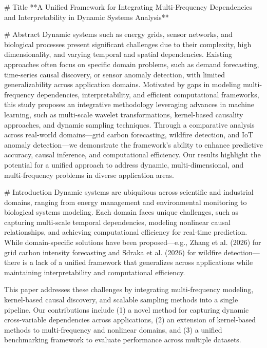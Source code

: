 # Title
**A Unified Framework for Integrating Multi-Frequency Dependencies and Interpretability in Dynamic Systems Analysis**

# Abstract
Dynamic systems such as energy grids, sensor networks, and biological processes present significant challenges due to their complexity, high dimensionality, and varying temporal and spatial dependencies. Existing approaches often focus on specific domain problems, such as demand forecasting, time-series causal discovery, or sensor anomaly detection, with limited generalizability across application domains. Motivated by gaps in modeling multi-frequency dependencies, interpretability, and efficient computational frameworks, this study proposes an integrative methodology leveraging advances in machine learning, such as multi-scale wavelet transformations, kernel-based causality approaches, and dynamic sampling techniques. Through a comparative analysis across real-world domains—grid carbon forecasting, wildfire detection, and IoT anomaly detection—we demonstrate the framework's ability to enhance predictive accuracy, causal inference, and computational efficiency. Our results highlight the potential for a unified approach to address dynamic, multi-dimensional, and multi-frequency problems in diverse application areas.

# Introduction
Dynamic systems are ubiquitous across scientific and industrial domains, ranging from energy management and environmental monitoring to biological systems modeling. Each domain faces unique challenges, such as capturing multi-scale temporal dependencies, modeling nonlinear causal relationships, and achieving computational efficiency for real-time prediction. While domain-specific solutions have been proposed—e.g., Zhang et al. (2026) for grid carbon intensity forecasting and Sdraka et al. (2026) for wildfire detection—there is a lack of a unified framework that generalizes across applications while maintaining interpretability and computational efficiency.

This paper addresses these challenges by integrating multi-frequency modeling, kernel-based causal discovery, and scalable sampling methods into a single pipeline. Our contributions include (1) a novel method for capturing dynamic cross-variable dependencies across applications, (2) an extension of kernel-based methods to multi-frequency and nonlinear domains, and (3) a unified benchmarking framework to evaluate performance across multiple datasets.

